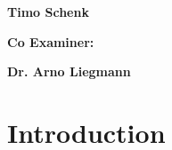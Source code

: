 \documentclass[11pt]{report}
\begin{document}
\begin{titlepage}
{\begin{minipage}[t]{0.47\textwidth}
                \end{minipage}
                \hfill
                \begin{minipage}[t]{0.47\textwidth}\raggedleft
                \large \textbf {Timo Schenk}\\
                \end{minipage}
                \begin{minipage}[t]{0.47\textwidth}
                \large \textbf {Co Examiner:}\\
                \end{minipage}
                \hfill
                \begin{minipage}[t]{0.47\textwidth}\raggedleft
                \large \textbf {Dr. Arno Liegmann}\\
                \end{minipage}
                \vfill
            }
        \clearpage
    \end{titlepage}
    \setcounter{page}{2}
    \tableofcontents
    \chapter{Introduction}\label{ch:introduction}
\end{document}
